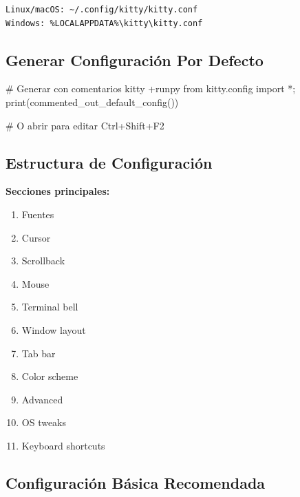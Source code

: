 \documentclass[
  doc,
  floatsintext,
  longtable,
  a4paper,
  nolmodern,
  notxfonts,
  notimes,
  12pt,
  colorlinks=true,linkcolor=blue,citecolor=blue,urlcolor=blue]{apa7}
\newenvironment{Shaded}{\begin{snugshade}}{\end{snugshade}}
\newcommand{\CommentTok}[1]{\textcolor[rgb]{0.37,0.37,0.37}{#1}}
\newcommand{\ExtensionTok}[1]{\textcolor[rgb]{0.00,0.23,0.31}{#1}}
\newcommand{\NormalTok}[1]{\textcolor[rgb]{0.00,0.23,0.31}{#1}}
\newcommand{\StringTok}[1]{\textcolor[rgb]{0.13,0.47,0.30}{#1}}
\providecommand{\tightlist}{%
  \setlength{\itemsep}{0pt}\setlength{\parskip}{0pt}}
\begin{document}
\begin{verbatim}
Linux/macOS: ~/.config/kitty/kitty.conf
Windows: %LOCALAPPDATA%\kitty\kitty.conf
\end{verbatim}

\subsection{Generar Configuración Por
Defecto}\label{generar-configuraciuxf3n-por-defecto}

\begin{Shaded}
\begin{Highlighting}[]
\CommentTok{\# Generar con comentarios}
\ExtensionTok{kitty}\NormalTok{ +runpy }\StringTok{\textquotesingle{}from kitty.config import *; print(commented\_out\_default\_config())\textquotesingle{}}

\CommentTok{\# O abrir para editar}
\ExtensionTok{Ctrl+Shift+F2}
\end{Highlighting}
\end{Shaded}

\subsection{Estructura de
Configuración}\label{estructura-de-configuraciuxf3n}

\textbf{Secciones principales:}

\begin{enumerate}
\def\labelenumi{\arabic{enumi}.}
\tightlist
\item
  Fuentes
\item
  Cursor
\item
  Scrollback
\item
  Mouse
\item
  Terminal bell
\item
  Window layout
\item
  Tab bar
\item
  Color scheme
\item
  Advanced
\item
  OS tweaks
\item
  Keyboard shortcuts
\end{enumerate}

\subsection{Configuración Básica
Recomendada}\label{configuraciuxf3n-buxe1sica-recomendada}
\end{document}
